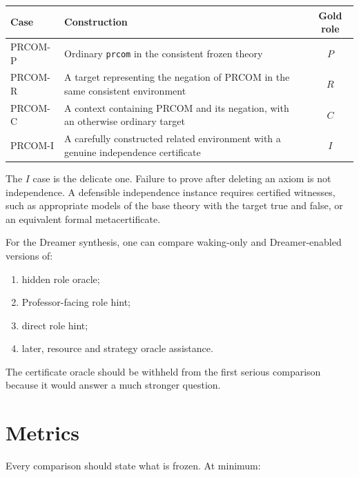 \begin{center}
\begin{tabular}{p{}p{}c}
\toprule
Case & Construction & Gold role \\
\midrule
PRCOM-P & Ordinary \texttt{prcom} in the consistent frozen theory & $P$ \\
PRCOM-R & A target representing the negation of PRCOM in the same consistent environment & $R$ \\
PRCOM-C & A context containing PRCOM and its negation, with an otherwise ordinary target & $C$ \\
PRCOM-I & A carefully constructed related environment with a genuine independence certificate & $I$ \\
\bottomrule
\end{tabular}
\end{center}

The $I$ case is the delicate one. Failure to prove after deleting an axiom is not independence. A defensible independence instance requires certified witnesses, such as appropriate models of the base theory with the target true and false, or an equivalent formal metacertificate.

For the Dreamer synthesis, one can compare waking-only and Dreamer-enabled versions of:
\begin{enumerate}[leftmargin=2em]
\item hidden role oracle;
\item Professor-facing role hint;
\item direct role hint;
\item later, resource and strategy oracle assistance.
\end{enumerate}

The certificate oracle should be withheld from the first serious comparison because it would answer a much stronger question.

\section{Metrics}

Every comparison should state what is frozen. At minimum:
